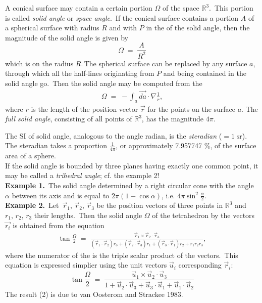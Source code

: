 \documentclass[12pt]{article}
\theoremstyle{definition}
\begin{document}
A conical surface may contain a certain portion $\Omega$ of the space $\mathbb{R}^3$.\, This portion is called \emph{solid angle} or \emph{space angle}.\, If the conical surface contains a portion $A$ of a spherical surface with radius $R$ and with  $P$ in the  of the solid angle, then the magnitude of the solid angle is given by
                   $$\Omega \;=\; \frac{A}{R^2}$$
which is  on the radius $R$.\,The spherical surface can be replaced by any surface $a$, through which all the half-lines originating from $P$ and being contained in the solid angle go.\, Then the solid angle may be computed from the 
\begin{align}         
\Omega \;=\; -\int_a \vec{da}\cdot\nabla\frac{1}{r},
\end{align}
where $r$ is the length of the position vector $\vec{r}$ for the points on the surface $a$.
 The \emph{full solid angle}, consisting of all points of $\mathbb{R}^3$, has the magnitude $4\pi$. 

The SI  of solid angle, analogous to the angle  radian, is the \emph{steradian} ($= 1\;\mbox{sr}$).\, The steradian takes a proportion $\frac{1}{4\pi}$, or approximately 7.957747 \%, of the surface area of a sphere.\\

If the solid angle is bounded by three planes having exactly one common point, it may be called a \emph{trihedral angle}; cf. the example 2!\\


\textbf{Example 1.}\,  The solid angle determined by a right circular cone with the angle $\alpha$ between its axis and  is equal to $2\pi(1\!-\cos\alpha)$, i.e. $\displaystyle 4\pi\sin^2{\frac{\alpha}{2}}$.\\

\textbf{Example 2.}\,  Let\, $\vec{r}_1,\,\vec{r}_2,\,\vec{r}_3$ be the position vectors of three points in $\mathbb{R}^3$ and $r_1,\,r_2,\,r_3$ their lengths.\, Then the solid angle $\Omega$ of the tetrahedron  by the vectors $\vec{r_i}$ is obtained from the equation
\begin{align}
\tan\frac{\Omega}{2} \;=\; 
\frac{\vec{r}_1\!\times\!\vec{r}_2\!\cdot\!\vec{r}_3}{(\vec{r}_1\!\cdot\!\vec{r}_2)r_3+(\vec{r}_2\!\cdot\!\vec{r}_3)r_1+(\vec{r}_3\!\cdot\!\vec{r}_1)r_2+r_1r_2r_3},
\end{align}
where the numerator of the  is the triple scalar product of the vectors.\, This equation is expressed simplier using the unit vectors $\vec{u}_i$ corresponding $\vec{r}_i$:
$$
\tan\frac{\Omega}{2} \;=\; 
 \frac{\vec{u}_1\!\times\!\vec{u}_2\!\cdot\!\vec{u}_3}
  {1+\vec{u}_2\!\cdot\!\vec{u}_3+\vec{u}_3\!\cdot\!\vec{u}_1+\vec{u}_1\!\cdot\!\vec{u}_2}
$$
The result (2) is due to van Oosterom and Strackee 1983.\\
\end{document}
